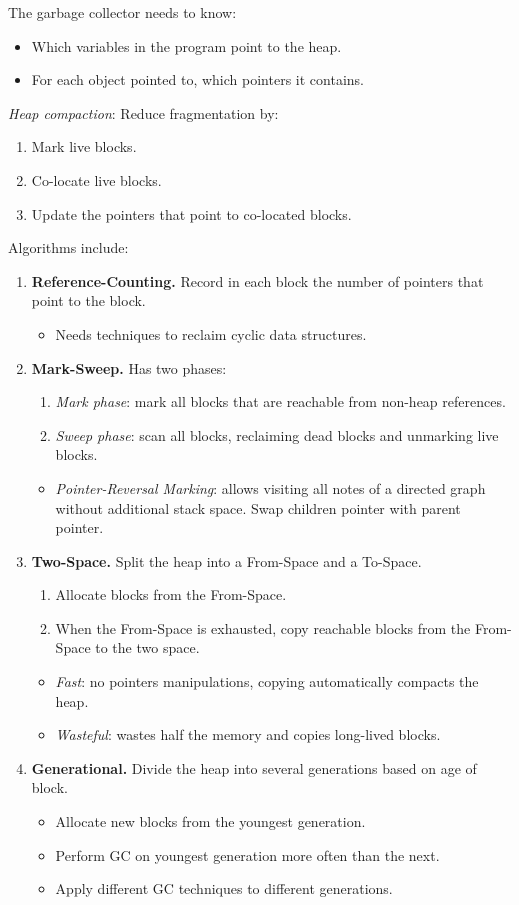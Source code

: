 \documentclass[twocolumn,english]{article}
\begin{document}
The garbage collector needs to know:
\begin{itemize}
\item Which variables in the program point to the heap.
\item For each object pointed to, which pointers it contains.
\end{itemize}
\emph{Heap compaction}: Reduce fragmentation by:
\begin{enumerate}
\item Mark live blocks.
\item Co-locate live blocks.
\item Update the pointers that point to co-located blocks.
\end{enumerate}
Algorithms include:
\begin{enumerate}
\item \textbf{Reference-Counting.} Record in each block the number of pointers
that point to the block.
\begin{itemize}
\item Needs techniques to reclaim cyclic data structures.
\end{itemize}
\item \textbf{Mark-Sweep.} Has two phases:
\begin{enumerate}
\item \emph{Mark phase}: mark all blocks that are reachable from non-heap
references.
\item \emph{Sweep phase}: scan all blocks, reclaiming dead blocks and unmarking
live blocks.
\end{enumerate}
\begin{itemize}
\item \emph{Pointer-Reversal Marking}: allows visiting all notes of a directed
graph without additional stack space. Swap children pointer with parent
pointer.
\end{itemize}
\item \textbf{Two-Space.} Split the heap into a From-Space and a To-Space.
\begin{enumerate}
\item Allocate blocks from the From-Space.
\item When the From-Space is exhausted, copy reachable blocks from the From-Space
to the two space.
\end{enumerate}
\begin{itemize}
\item \emph{Fast}: no pointers manipulations, copying automatically compacts
the heap.
\item \emph{Wasteful}: wastes half the memory and copies long-lived blocks.
\end{itemize}
\item \textbf{Generational.} Divide the heap into several generations based
on age of block.
\begin{itemize}
\item Allocate new blocks from the youngest generation.
\item Perform GC on youngest generation more often than the next.
\item Apply different GC techniques to different generations.
\end{itemize}
\end{enumerate}
\end{document}
